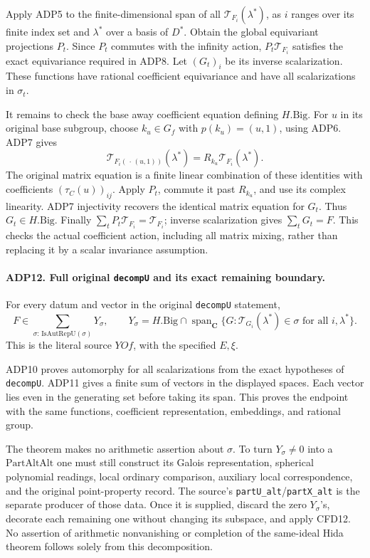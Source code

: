 \documentclass[11pt,a4paper]{article}
\numberwithin{equation}{section}
\theoremstyle{remark}\newtheorem{remark}[theorem]{Remark}
\begin{document}
Apply ADP5 to the finite-dimensional span of all
\(\mathcal T_{F_i}(\lambda^*)\), as \(i\) ranges over its finite
index set and \(\lambda^*\) over a basis of \(D^*\).  Obtain the
global equivariant projections \(P_t\).  Since \(P_t\) commutes with
the infinity action, \(P_t\mathcal T_{F_i}\) satisfies the exact
equivariance required in ADP8.  Let \((G_t)_i\) be its inverse
scalarization.  These functions have rational coefficient equivariance
and have all scalarizations in \(\sigma_t\).

It remains to check the base away coefficient equation defining
\(H.\mathrm{Big}\).  For \(u\) in its original base subgroup, choose
\(k_u\in G_f\) with \(p(k_u)=(u,1)\), using ADP6.  ADP7 gives
\[
 \mathcal T_{F_i(\,\cdot\,(u,1))}(\lambda^*)
      =R_{k_u}\mathcal T_{F_i}(\lambda^*).
\]
The original matrix equation is a finite linear combination of these
identities with coefficients \((\tau_C(u))_{ij}\).  Apply \(P_t\),
commute it past \(R_{k_u}\), and use its complex linearity.  ADP7
injectivity recovers the identical matrix equation for \(G_t\).
Thus \(G_t\in H.\mathrm{Big}\).  Finally
\(\sum_tP_t\mathcal T_{F_i}=\mathcal T_{F_i}\); inverse
scalarization gives \(\sum_tG_t=F\).  This checks the actual
coefficient action, including all matrix mixing, rather than replacing
it by a scalar invariance assumption.

\paragraph{ADP12. Full original \texttt{decomp\allowbreak U} and its exact remaining boundary.}
\label{claim:ADP12}
For every datum and vector in the original \texttt{decomp\allowbreak U} statement,
\[
 F\in\sum_{\sigma:\,\mathrm{IsAutRepU}(\sigma)}
       Y_{\sigma},\qquad
 Y_{\sigma}=H.\mathrm{Big}\cap
       \operatorname{span}_{\mathbf C}
       \{G:\mathcal T_{G_i}(\lambda^*)\in\sigma
                                   \text{ for all }i,\lambda^*\}.
\]
This is the literal source \(YOf\), with the specified \(E,\xi\).

ADP10 proves automorphy for all scalarizations from the exact hypotheses
of \texttt{decomp\allowbreak U}.  ADP11 gives a finite sum of vectors in the
displayed spaces.  Each vector lies even in the generating set before
taking its span.  This proves the endpoint with the same functions,
coefficient representation, embeddings, and rational group.

The theorem makes no arithmetic assertion about \(\sigma\).  To turn
\(Y_\sigma\ne0\) into a \(\mathrm{PartAltAlt}\) one must still
construct its Galois representation, spherical polynomial readings,
local ordinary comparison, auxiliary local correspondence, and the
original point-property record.  The source's
\texttt{part\allowbreak U\_\allowbreak alt}/\texttt{part\allowbreak X\_\allowbreak alt} is the separate producer of
those data.  Once it is supplied, discard the zero \(Y_\sigma\)'s,
decorate each remaining one without changing its subspace, and apply
CFD12.  No assertion of arithmetic nonvanishing or completion of the
same-ideal Hida theorem follows solely from this decomposition.
\end{document}
